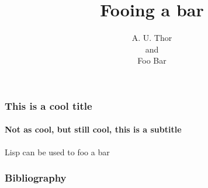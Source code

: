 \documentclass[aspectratio=169]{beamer}
\author[A. U. Thor, Foo Bar]{A. U. Thor\\and\\Foo Bar}
\title{Fooing a bar}
\begin{document}
\begin{frame}
	\maketitle
\end{frame}

\begin{frame}
	\frametitle{This is a cool title}
	\framesubtitle{Not as cool, but still cool, this is a subtitle}
	Lisp can be used to foo a bar \cite{sicp}
\end{frame}

\begin{frame}
	\frametitle{Bibliography}
	\printbibliography
\end{frame}
\end{document}
